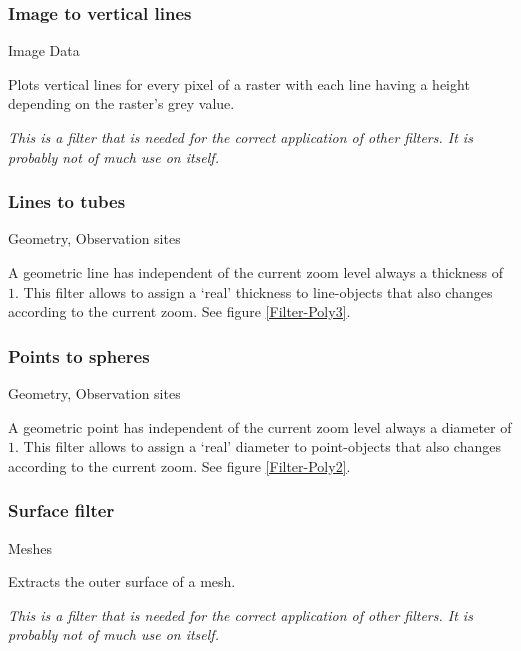 \subsubsection{Image to vertical lines}
 Image Data

 Plots vertical lines for every pixel of a raster with each line having a height depending on the raster's grey value.

 \emph{This is a filter that is needed for the correct application of other filters. It is probably not of much use on itself.}

\subsubsection{Lines to tubes}
 Geometry, Observation sites

 A geometric line has independent of the current zoom level always a thickness of $1$. This filter allows to assign a `real' thickness to line-objects that also changes according to the current zoom. See figure \ref{Filter-Poly3}.

\subsubsection{Points to spheres}
 Geometry, Observation sites

 A geometric point has independent of the current zoom level always a diameter of $1$. This filter allows to assign a `real' diameter to point-objects that also changes according to the current zoom. See figure \ref{Filter-Poly2}.

\subsubsection{Surface filter}
 Meshes

 Extracts the outer surface of a mesh.

 \emph{This is a filter that is needed for the correct application of other filters. It is probably not of much use on itself.}
